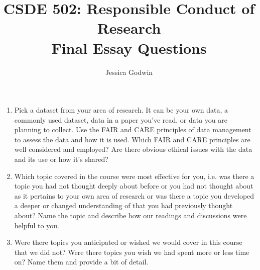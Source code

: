 \documentclass[11pt]{article}
\title{CSDE 502: Responsible Conduct of Research\\ Final Essay Questions}
\author{Jessica Godwin}
\begin{document}
\maketitle

\begin{enumerate}
\item Pick a dataset from your area of research. It can be your own data, a commonly used dataset, data in a paper you've read, or data you are planning to collect. Use the FAIR and CARE principles of data management to assess the data and how it is used. Which FAIR and CARE principles are well considered and employed? Are there obvious ethical issues with the data and its use or how it's shared? 
\item Which topic covered in the course were most effective for you, i.e. was there a topic you had not thought deeply about before or you had not thought about as it pertains to your own area of research or was there a topic you developed a deeper or changed understanding of that you had previously thought about? Name the topic and describe how our readings and discussions were helpful to you.
\item Were there topics you anticipated or wished we would cover in this course that we did not? Were there topics you wish we had spent more or less time on? Name them and provide a bit of detail.
\end{enumerate}
\end{document}
